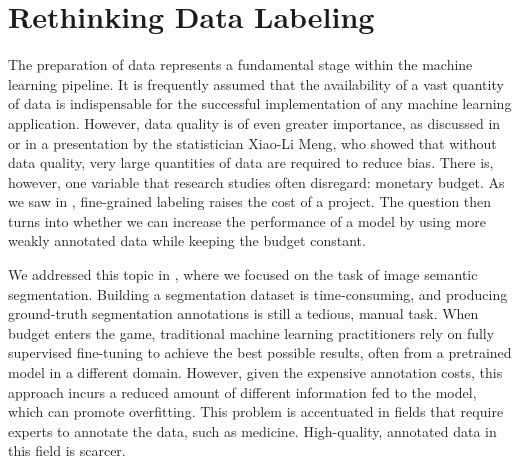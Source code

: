 
\section{Rethinking Data Labeling}
\label{sec:disc_fullweak}

The preparation of data represents a fundamental stage within the machine learning pipeline. It is frequently assumed that the availability of a vast quantity of data is indispensable for the successful implementation of any machine learning application. However, data quality is of even greater importance, as discussed in  or in a presentation by the statistician Xiao-Li Meng, who showed that without data quality, very large quantities of data are required to reduce bias. There is, however, one variable that research studies often disregard: monetary budget. As we saw in , fine-grained labeling raises the cost of a project. The question then turns into whether we can increase the performance of a model by using more weakly annotated data while keeping the budget constant.


We addressed this topic in , where we focused on the task of image semantic segmentation. Building a segmentation dataset is time-consuming, and producing ground-truth segmentation annotations is still a tedious, manual task. When budget enters the game, traditional machine learning practitioners rely on fully supervised fine-tuning to achieve the best possible results, often from a pretrained model in a different domain. However, given the expensive annotation costs, this approach incurs a reduced amount of different information fed to the model, which can promote overfitting. This problem is accentuated in fields that require experts to annotate the data, such as medicine. High-quality, annotated data in this field is scarcer.

